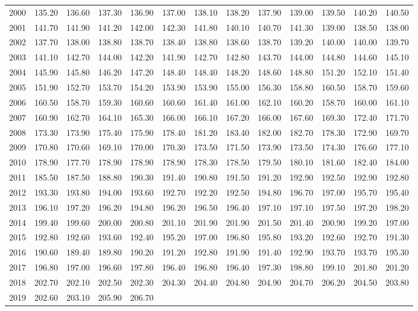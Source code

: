 \begin{longtable}{rrrrrrrrrrrrr}
  2000 & 135.20 & 136.60 & 137.30 & 136.90 & 137.00 & 138.10 & 138.20 & 137.90 & 139.00 & 139.50 & 140.20 & 140.50 \\ 
  2001 & 141.70 & 141.90 & 141.20 & 142.00 & 142.30 & 141.80 & 140.10 & 140.70 & 141.30 & 139.00 & 138.50 & 138.00 \\ 
  2002 & 137.70 & 138.00 & 138.80 & 138.70 & 138.40 & 138.80 & 138.60 & 138.70 & 139.20 & 140.00 & 140.00 & 139.70 \\ 
  2003 & 141.10 & 142.70 & 144.00 & 142.20 & 141.90 & 142.70 & 142.80 & 143.70 & 144.00 & 144.80 & 144.60 & 145.10 \\ 
  2004 & 145.90 & 145.80 & 146.20 & 147.20 & 148.40 & 148.40 & 148.20 & 148.60 & 148.80 & 151.20 & 152.10 & 151.40 \\ 
  2005 & 151.90 & 152.70 & 153.70 & 154.20 & 153.90 & 153.90 & 155.00 & 156.30 & 158.80 & 160.50 & 158.70 & 159.60 \\ 
  2006 & 160.50 & 158.70 & 159.30 & 160.60 & 160.60 & 161.40 & 161.00 & 162.10 & 160.20 & 158.70 & 160.00 & 161.10 \\ 
  2007 & 160.90 & 162.70 & 164.10 & 165.30 & 166.00 & 166.10 & 167.20 & 166.00 & 167.60 & 169.30 & 172.40 & 171.70 \\ 
  2008 & 173.30 & 173.90 & 175.40 & 175.90 & 178.40 & 181.20 & 183.40 & 182.00 & 182.70 & 178.30 & 172.90 & 169.70 \\ 
  2009 & 170.80 & 170.60 & 169.10 & 170.00 & 170.30 & 173.50 & 171.50 & 173.90 & 173.50 & 174.30 & 176.60 & 177.10 \\ 
  2010 & 178.90 & 177.70 & 178.90 & 178.90 & 178.90 & 178.30 & 178.50 & 179.50 & 180.10 & 181.60 & 182.40 & 184.00 \\ 
  2011 & 185.50 & 187.50 & 188.80 & 190.30 & 191.40 & 190.80 & 191.50 & 191.20 & 192.90 & 192.50 & 192.90 & 192.80 \\ 
  2012 & 193.30 & 193.80 & 194.00 & 193.60 & 192.70 & 192.20 & 192.50 & 194.80 & 196.70 & 197.00 & 195.70 & 195.40 \\ 
  2013 & 196.10 & 197.20 & 196.20 & 194.80 & 196.20 & 196.50 & 196.40 & 197.10 & 197.10 & 197.50 & 197.20 & 198.20 \\ 
  2014 & 199.40 & 199.60 & 200.00 & 200.80 & 201.10 & 201.90 & 201.90 & 201.50 & 201.40 & 200.90 & 199.20 & 197.00 \\ 
  2015 & 192.80 & 192.60 & 193.60 & 192.40 & 195.20 & 197.00 & 196.80 & 195.80 & 193.20 & 192.60 & 192.70 & 191.30 \\ 
  2016 & 190.60 & 189.40 & 189.80 & 190.20 & 191.20 & 192.80 & 191.90 & 191.40 & 192.90 & 193.70 & 193.70 & 195.30 \\ 
  2017 & 196.80 & 197.00 & 196.60 & 197.80 & 196.40 & 196.80 & 196.40 & 197.30 & 198.80 & 199.10 & 201.80 & 201.20 \\ 
  2018 & 202.70 & 202.10 & 202.50 & 202.30 & 204.30 & 204.40 & 204.80 & 204.90 & 204.70 & 206.20 & 204.50 & 203.80 \\ 
  2019 & 202.60 & 203.10 & 205.90 & 206.70 &  &  &  &  &  &  &  &  \\ 
   \hline
\hline
\end{longtable}
